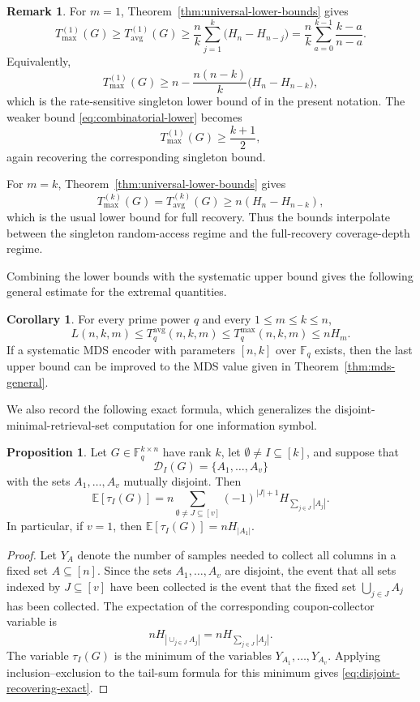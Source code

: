 \documentclass[11pt,a4paper]{article}
\numberwithin{equation}{section}
\theoremstyle{definition}
\newtheorem{remark}[definition]{Remark}
\theoremstyle{definition}
\newtheorem{proposition}[definition]{Proposition}
\newtheorem{corollary}[definition]{Corollary}
\newcommand{\F}{\mathbb{F}}
\newcommand{\E}{\mathbb{E}}
\newcommand{\cD}{\mathcal{D}}
\newcommand{\Tmax}{T_{\max}}
\newcommand{\Tavg}{T_{\mathrm{avg}}}
\begin{document}
\begin{remark}\label{rem:bounds-extremes}
For $m=1$, Theorem~\ref{thm:universal-lower-bounds} gives
\[
\Tmax^{(1)}(G)
\geq
\Tavg^{(1)}(G)
\geq
\frac{n}{k}\sum_{j=1}^{k}\bigl(H_n-H_{n-j}\bigr)
=
\frac{n}{k}\sum_{a=0}^{k-1}\frac{k-a}{n-a}.
\]
Equivalently,
\[
\Tmax^{(1)}(G)
\geq
n-\frac{n(n-k)}{k}\bigl(H_n-H_{n-k}\bigr),
\]
which is the rate-sensitive singleton lower bound of \cite{bar2024cover} in the present notation.  The weaker bound \eqref{eq:combinatorial-lower} becomes
\[
\Tmax^{(1)}(G)\geq \frac{k+1}{2},
\]
again recovering the corresponding singleton bound.

For $m=k$, Theorem~\ref{thm:universal-lower-bounds} gives
\[
\Tmax^{(k)}(G)=\Tavg^{(k)}(G)
\geq n(H_n-H_{n-k}),
\]
which is the usual lower bound for full recovery.  Thus the bounds interpolate between the singleton random-access regime and the full-recovery coverage-depth regime.
\end{remark}

Combining the lower bounds with the systematic upper bound gives the following general estimate for the extremal quantities.

\begin{corollary}\label{cor:extremal-general-bounds}
For every prime power $q$ and every $1\leq m\leq k\leq n$,
\[
L(n,k,m)
\leq
T_q^{\mathrm{avg}}(n,k,m)
\leq
T_q^{\max}(n,k,m)
\leq
nH_m.
\]
If a systematic MDS encoder with parameters $[n,k]$ over $\F_q$ exists, then the last upper bound can be improved to the MDS value given in Theorem~\ref{thm:mds-general}.
\end{corollary}

We also record the following exact formula, which generalizes the disjoint-minimal-retrieval-set computation for one information symbol.

\begin{proposition}\label{prop:disjoint-recovering-sets}
Let $G\in \F_q^{k\times n}$ have rank $k$, let $\emptyset\neq I\subseteq [k]$, and suppose that
\[
\cD_I(G)=\{A_1,\ldots,A_v\}
\]
with the sets $A_1,
\ldots,A_v$ mutually disjoint.  Then
\begin{equation}\label{eq:disjoint-recovering-exact}
\E[\tau_I(G)]
=
n\sum_{\emptyset\neq J\subseteq [v]}
(-1)^{|J|+1}
H_{\sum_{j\in J}|A_j|}.
\end{equation}
In particular, if $v=1$, then $\E[\tau_I(G)]=nH_{|A_1|}$.
\end{proposition}

\begin{proof}
Let $Y_A$ denote the number of samples needed to collect all columns in a fixed set $A\subseteq [n]$.  Since the sets $A_1,\ldots,A_v$ are disjoint, the event that all sets indexed by $J\subseteq [v]$ have been collected is the event that the fixed set $\bigcup_{j\in J}A_j$ has been collected.  The expectation of the corresponding coupon-collector variable is
\[
nH_{|\cup_{j\in J}A_j|}
=
nH_{\sum_{j\in J}|A_j|}.
\]
The variable $\tau_I(G)$ is the minimum of the variables $Y_{A_1},\ldots,Y_{A_v}$.  Applying inclusion--exclusion to the tail-sum formula for this minimum gives \eqref{eq:disjoint-recovering-exact}.
\end{proof}
\end{document}
